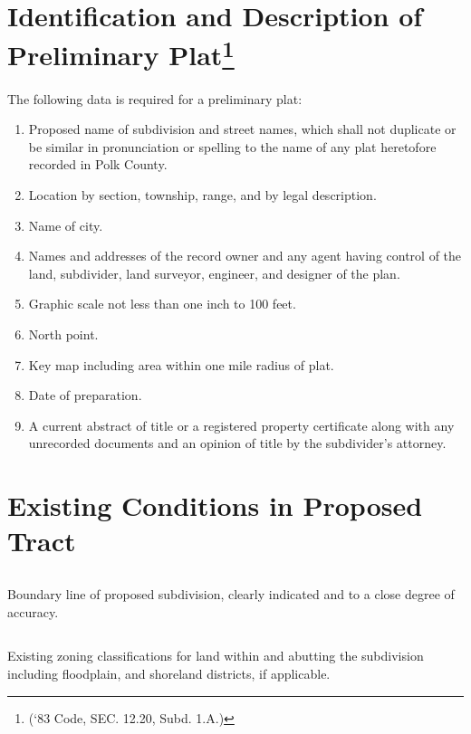 \section{Identification and Description of Preliminary Plat\footnote{(‘83 Code, SEC. 12.20, Subd. 1.A.)}}
The following data is required for a preliminary plat:
\begin{enumerate}[{\indent}A)]
    \item Proposed name of subdivision and street names, which shall not duplicate or be similar in pronunciation or spelling to the name of any plat heretofore recorded in Polk County.
    \item Location by section, township, range, and by legal description.
    \item Name of city.
    \item Names and addresses of the record owner and any agent having control of the land, subdivider, land surveyor, engineer, and designer of the plan.
    \item Graphic scale not less than one inch to 100 feet.
    \item North point.
    \item Key map including area within one mile radius of plat.
    \item Date of preparation.
    \item A current abstract of title or a registered property certificate along with any unrecorded documents and an opinion of title by the subdivider’s attorney.
\end{enumerate}

\section{Existing Conditions in Proposed Tract}
\subsection{}
Boundary line of proposed subdivision, clearly indicated and to a close degree of accuracy.
\subsection{}
Existing zoning classifications for land within and abutting the subdivision including floodplain, and shoreland districts, if applicable.
